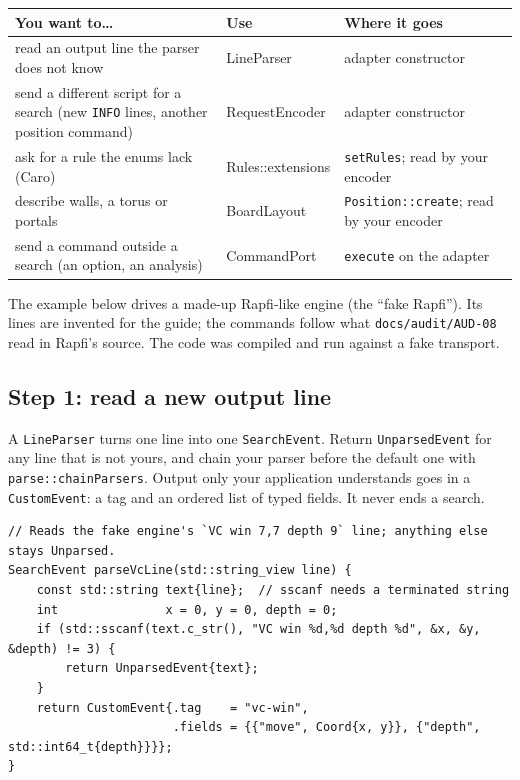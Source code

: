 \documentclass[11pt,a4paper]{article}
\newcommand{\code}[1]{\texttt{#1}}
\newcommand{\file}[1]{\texttt{#1}}
\begin{document}
\begin{center}
\small
\begin{tabularx}{\textwidth}{@{}X >{\ttfamily}l X@{}}
\toprule
\textbf{You want to\ldots} & \normalfont\textbf{Use} & \textbf{Where it goes} \\
\midrule
read an output line the parser does not know & LineParser & adapter constructor \\
send a different script for a search (new \code{INFO} lines, another position command) &
  RequestEncoder & adapter constructor \\
ask for a rule the enums lack (Caro) & Rules::extensions & \code{setRules}; read by your encoder \\
describe walls, a torus or portals & BoardLayout & \code{Position::create}; read by your encoder \\
send a command outside a search (an option, an analysis) & CommandPort & \code{execute} on the
  adapter \\
\bottomrule
\end{tabularx}
\end{center}

\noindent The example below drives a made-up Rapfi-like engine (the ``fake Rapfi''). Its lines are
invented for the guide; the commands follow what \file{docs/audit/AUD-08} read in Rapfi's source.
The code was compiled and run against a fake transport.

\subsection{Step 1: read a new output line}

A \code{LineParser} turns one line into one \code{SearchEvent}. Return \code{UnparsedEvent} for any
line that is not yours, and chain your parser before the default one with
\code{parse::chainParsers}. Output only your application understands goes in a
\code{CustomEvent}: a tag and an ordered list of typed fields. It never ends a search.

\begin{lstlisting}
// Reads the fake engine's `VC win 7,7 depth 9` line; anything else stays Unparsed.
SearchEvent parseVcLine(std::string_view line) {
    const std::string text{line};  // sscanf needs a terminated string
    int               x = 0, y = 0, depth = 0;
    if (std::sscanf(text.c_str(), "VC win %d,%d depth %d", &x, &y, &depth) != 3) {
        return UnparsedEvent{text};
    }
    return CustomEvent{.tag    = "vc-win",
                       .fields = {{"move", Coord{x, y}}, {"depth", std::int64_t{depth}}}};
}
\end{lstlisting}
\end{document}
